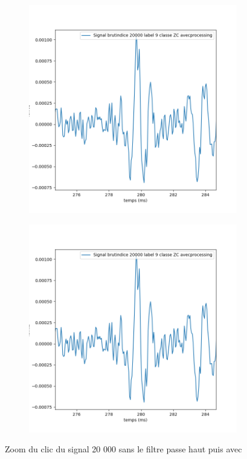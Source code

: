\begin{figure}[!h]
\centering
  \begin{subfigure}[b]{0.45\textwidth}
    \includegraphics[width=\textwidth]{./images/indice20000Spectro1Dlabel9classeZCavecprocessingaveczoom.png}
  \end{subfigure}
  \begin{subfigure}[b]{0.45\textwidth}
    \includegraphics[width=\textwidth]{./images/indice20000Spectro1Dlabel9classeZCavecprocessingaveczoom.png}
  \end{subfigure}
\caption{Zoom du clic du signal 20 000 sans le filtre passe haut puis avec}
\end{figure}

